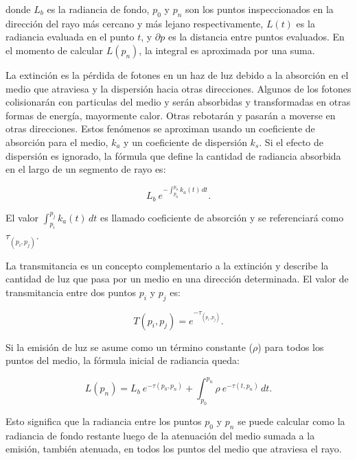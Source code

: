 \noindent donde $L_b$ es la radiancia de fondo, $p_0$ y $p_n$ son los puntos inspeccionados en la dirección del rayo más cercano y más lejano respectivamente, $L(t)$ es la radiancia evaluada en el punto $t$, y $\partial p$ es la distancia entre puntos evaluados. En el momento de calcular $L(p_n)$, la integral es aproximada por una suma.

La extinción es la pérdida de fotones en un haz de luz debido a la absorción en el medio que atraviesa y la dispersión hacia otras direcciones. Algunos de los fotones colisionarán con particulas del medio y serán absorbidas y transformadas en otras formas de energía, mayormente calor. Otras rebotarán y pasarán a moverse en otras direcciones. Estos fenómenos se aproximan usando un coeficiente de absorción para el medio, $k_a$ y un coeficiente de dispersión $k_s$. Si el efecto de dispersión es ignorado, la fórmula que define la cantidad de radiancia absorbida en el largo de un segmento de rayo
es: 

\begin{equation} \label{eq:radiance_absorption}  
    L_b \ e^{- \textstyle  \int_{p_0}^{p_n} k_a(t) \, dt}.
\end{equation}

El valor $\int_{p_i}^{p_j} k_a(t) \, dt$ es llamado coeficiente de absorción y se referenciar\'a como $\tau_{(p_i, p_j)}$.

La transmitancia es un concepto complementario a la extinción y describe la cantidad de luz que pasa por un medio en una dirección determinada. El valor de transmitancia entre dos puntos $p_i$ y $p_j$
es:

\begin{equation} \label{eq:general_radiance}  
  T(p_i,p_j) = e^{- \textstyle \tau_{(p_i, p_j)}}.
\end{equation}

Si la emisión de luz se asume como un término constante ($\rho$) para todos los puntos del medio, la fórmula inicial de radiancia queda:

\begin{equation} \label{eq:ray_radiance}  
  L(p_n) = L_b \ e^{-\tau(p_0, p_n)} + \int_{p_0}^{p_n} \rho \ e^{-\tau(t,p_n)} \, dt.
\end{equation}

Esto significa que la radiancia entre los puntos $p_0$ y $p_n$ se puede calcular como la radiancia de fondo restante luego de la atenuación del medio sumada a la emisión, también atenuada, en todos los puntos del medio que atraviesa el rayo.


